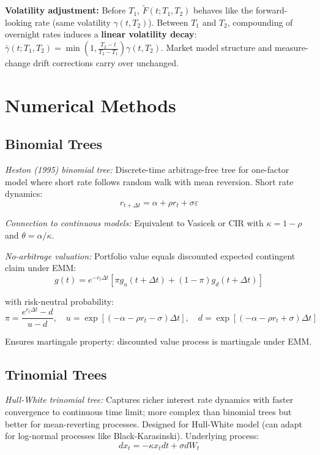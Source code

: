 \documentclass[12pt,a4paper]{article}
\begin{document}
\vspace{0.3em}
\noindent\textbf{Volatility adjustment:} Before $T_1$, $\tilde{F}(t;T_1,T_2)$ behaves like the forward-looking rate (same volatility $\gamma(t,T_2)$). Between $T_1$ and $T_2$, compounding of overnight rates induces a \textbf{linear volatility decay}: $\bar{\gamma}(t;T_1,T_2) = \min\!\left(1, \frac{T_2-t}{T_2-T_1}\right)\gamma(t,T_2)$. Market model structure and measure-change drift corrections carry over unchanged.











\section{Numerical Methods}


\subsection{Binomial Trees}

\textit{Heston (1995) binomial tree:} Discrete-time arbitrage-free tree for one-factor model where short rate follows random walk with mean reversion. Short rate dynamics:
$$r_{t+\Delta t} = \alpha + \rho r_t + \sigma\varepsilon$$

\textit{Connection to continuous models:} Equivalent to Vasicek or CIR with $\kappa = 1 - \rho$ and $\theta = \alpha/\kappa$. 

\textit{No-arbitrage valuation:} Portfolio value equals discounted expected contingent claim under EMM:
$$g(t) = e^{-r_t\Delta t}[\pi g_u(t+\Delta t) + (1-\pi)g_d(t+\Delta t)]$$

with risk-neutral probability:
$$\pi = \frac{e^{r_t\Delta t} - d}{u - d}, \quad u = \exp[(-\alpha - \rho r_t - \sigma)\Delta t], \quad d = \exp[(-\alpha - \rho r_t + \sigma)\Delta t]$$

Ensures martingale property: discounted value process is martingale under EMM.

\subsection{Trinomial Trees}

\textit{Hull-White trinomial tree:} Captures richer interest rate dynamics with faster convergence to continuous time limit; more complex than binomial trees but better for mean-reverting processes. Designed for Hull-White model (can adapt for log-normal processes like Black-Karasinski). Underlying process:
$$dx_t = -\kappa x_t dt + \sigma dW_t$$
\end{document}

